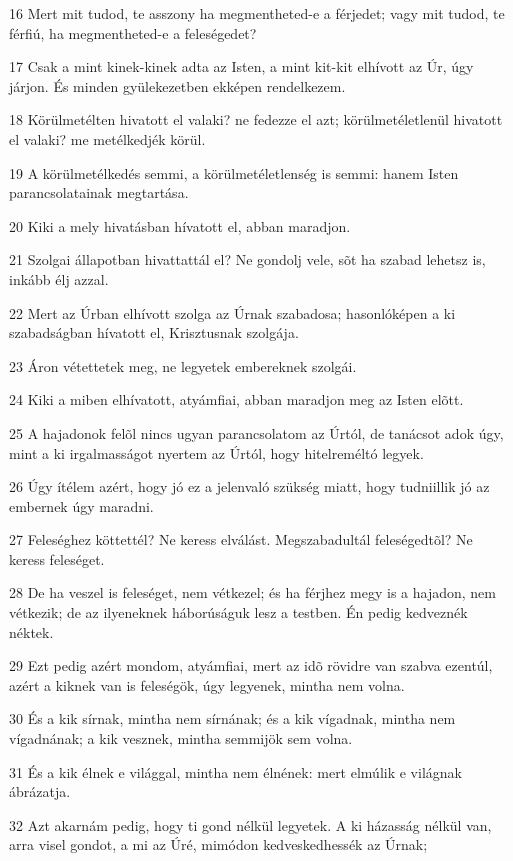 \par 16 Mert mit tudod, te asszony ha megmentheted-e a férjedet; vagy mit tudod, te férfiú, ha megmentheted-e a feleségedet?
\par 17 Csak a mint kinek-kinek adta az Isten, a mint kit-kit elhívott az Úr, úgy járjon. És minden gyülekezetben ekképen rendelkezem.
\par 18 Körülmetélten hivatott el valaki? ne fedezze el azt; körülmetéletlenül hivatott el valaki? me metélkedjék körül.
\par 19 A körülmetélkedés semmi, a körülmetéletlenség is semmi: hanem Isten parancsolatainak megtartása.
\par 20 Kiki a mely hivatásban hívatott el, abban maradjon.
\par 21 Szolgai állapotban hivattattál el? Ne gondolj vele, sõt ha szabad lehetsz is, inkább élj azzal.
\par 22 Mert az Úrban elhívott szolga az Úrnak szabadosa; hasonlóképen a ki szabadságban hívatott el,  Krisztusnak szolgája.
\par 23 Áron vétettetek meg, ne legyetek embereknek szolgái.
\par 24 Kiki a miben elhívatott, atyámfiai, abban maradjon meg az Isten elõtt.
\par 25 A hajadonok felõl nincs ugyan parancsolatom az Úrtól, de tanácsot adok úgy, mint a ki irgalmasságot nyertem az Úrtól, hogy hitelreméltó legyek.
\par 26 Úgy ítélem azért, hogy jó ez a jelenvaló szükség miatt, hogy tudniillik jó az embernek úgy maradni.
\par 27 Feleséghez köttettél? Ne keress elválást. Megszabadultál feleségedtõl? Ne keress feleséget.
\par 28 De ha veszel is feleséget, nem vétkezel; és ha férjhez megy is a hajadon, nem vétkezik; de az ilyeneknek háborúságuk lesz a testben. Én pedig kedveznék néktek.
\par 29 Ezt pedig azért mondom, atyámfiai, mert az idõ rövidre van szabva ezentúl, azért a kiknek van is feleségök, úgy legyenek, mintha nem volna.
\par 30 És a kik sírnak, mintha nem sírnának; és a kik vígadnak, mintha nem vígadnának; a kik vesznek, mintha semmijök sem volna.
\par 31 És a kik élnek e világgal, mintha nem élnének: mert elmúlik e világnak ábrázatja.
\par 32 Azt akarnám pedig, hogy ti gond nélkül legyetek. A ki házasság nélkül van, arra visel gondot, a mi az Úré, mimódon kedveskedhessék az Úrnak;

